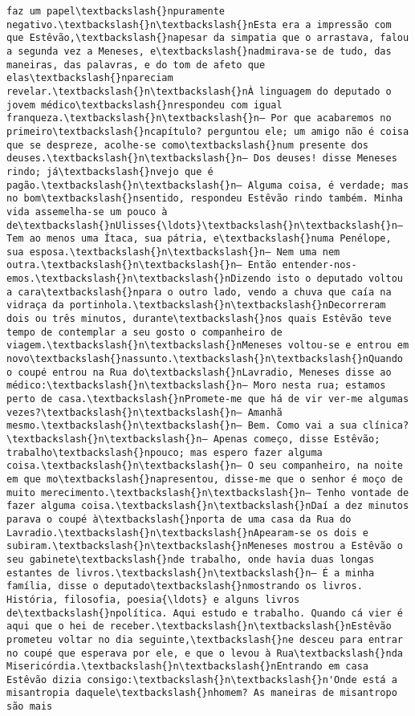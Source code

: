 \begin{Verbatim}[commandchars=\\\{\}]
faz um papel\textbackslash{}npuramente negativo.\textbackslash{}n\textbackslash{}nEsta era a impressão com que Estêvão,\textbackslash{}napesar da simpatia que o arrastava, falou a segunda vez a Meneses, e\textbackslash{}nadmirava-se de tudo, das maneiras, das palavras, e do tom de afeto que elas\textbackslash{}npareciam revelar.\textbackslash{}n\textbackslash{}nÀ linguagem do deputado o jovem médico\textbackslash{}nrespondeu com igual franqueza.\textbackslash{}n\textbackslash{}n— Por que acabaremos no primeiro\textbackslash{}ncapítulo? perguntou ele; um amigo não é coisa que se despreze, acolhe-se como\textbackslash{}num presente dos deuses.\textbackslash{}n\textbackslash{}n— Dos deuses! disse Meneses rindo; já\textbackslash{}nvejo que é pagão.\textbackslash{}n\textbackslash{}n— Alguma coisa, é verdade; mas no bom\textbackslash{}nsentido, respondeu Estêvão rindo também. Minha vida assemelha-se um pouco à de\textbackslash{}nUlisses{\ldots}\textbackslash{}n\textbackslash{}n— Tem ao menos uma Ítaca, sua pátria, e\textbackslash{}numa Penélope, sua esposa.\textbackslash{}n\textbackslash{}n— Nem uma nem outra.\textbackslash{}n\textbackslash{}n— Então entender-nos-emos.\textbackslash{}n\textbackslash{}nDizendo isto o deputado voltou a cara\textbackslash{}npara o outro lado, vendo a chuva que caía na vidraça da portinhola.\textbackslash{}n\textbackslash{}nDecorreram dois ou três minutos, durante\textbackslash{}nos quais Estêvão teve tempo de contemplar a seu gosto o companheiro de viagem.\textbackslash{}n\textbackslash{}nMeneses voltou-se e entrou em novo\textbackslash{}nassunto.\textbackslash{}n\textbackslash{}nQuando o coupé entrou na Rua do\textbackslash{}nLavradio, Meneses disse ao médico:\textbackslash{}n\textbackslash{}n— Moro nesta rua; estamos perto de casa.\textbackslash{}nPromete-me que há de vir ver-me algumas vezes?\textbackslash{}n\textbackslash{}n— Amanhã mesmo.\textbackslash{}n\textbackslash{}n— Bem. Como vai a sua clínica?\textbackslash{}n\textbackslash{}n— Apenas começo, disse Estêvão; trabalho\textbackslash{}npouco; mas espero fazer alguma coisa.\textbackslash{}n\textbackslash{}n— O seu companheiro, na noite em que mo\textbackslash{}napresentou, disse-me que o senhor é moço de muito merecimento.\textbackslash{}n\textbackslash{}n— Tenho vontade de fazer alguma coisa.\textbackslash{}n\textbackslash{}nDaí a dez minutos parava o coupé à\textbackslash{}nporta de uma casa da Rua do Lavradio.\textbackslash{}n\textbackslash{}nApearam-se os dois e subiram.\textbackslash{}n\textbackslash{}nMeneses mostrou a Estêvão o seu gabinete\textbackslash{}nde trabalho, onde havia duas longas estantes de livros.\textbackslash{}n\textbackslash{}n— É a minha família, disse o deputado\textbackslash{}nmostrando os livros. História, filosofia, poesia{\ldots} e alguns livros de\textbackslash{}npolítica. Aqui estudo e trabalho. Quando cá vier é aqui que o hei de receber.\textbackslash{}n\textbackslash{}nEstêvão prometeu voltar no dia seguinte,\textbackslash{}ne desceu para entrar no coupé que esperava por ele, e que o levou à Rua\textbackslash{}nda Misericórdia.\textbackslash{}n\textbackslash{}nEntrando em casa Estêvão dizia consigo:\textbackslash{}n\textbackslash{}n'Onde está a misantropia daquele\textbackslash{}nhomem? As maneiras de misantropo são mais 
\end{Verbatim}
